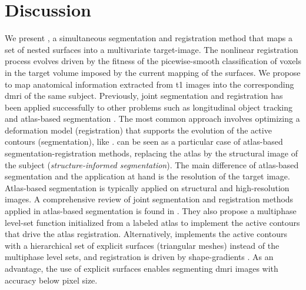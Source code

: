 \section{Discussion}
\label{sec:regseg-discussion}
We present \regseg{}, a simultaneous segmentation and registration method that
  maps a set of nested surfaces into a multivariate target-image.
The nonlinear registration process evolves driven by the fitness of the
  picewise-smooth classification of voxels in the target volume imposed
  by the current mapping of the surfaces.
We propose \regseg{} to map anatomical information extracted from \gls*{t1}
  images into the corresponding \gls*{dmri} of the same subject.
Previously, joint segmentation and registration has been applied successfully to
  other problems such as longitudinal object tracking \citep{paragios_level_2003}
  and atlas-based segmentation \citep{gorthi_active_2011}.
The most common approach involves optimizing a deformation model (registration)
  that supports the evolution of the active contours (segmentation),
  like \cite{paragios_level_2003,yezzi_variational_2003}.
\Regseg{} can be seen as a particular case of atlas-based segmentation-registration methods,
  replacing the atlas by the structural image of the subject (\emph{structure-informed segmentation}).
The main difference of atlas-based segmentation and the application at hand is the resolution of the
  target image.
Atlas-based segmentation is typically applied on structural and high-resolution images.
A comprehensive review of joint segmentation and registration methods applied in atlas-based
  segmentation is found in \citep{gorthi_active_2011}.
They also propose a multiphase level-set function initialized from a labeled atlas to implement
  the active contours that drive the atlas registration.
Alternatively, \regseg{} implements the active contours with a hierarchical set of explicit
  surfaces (triangular meshes) instead of the multiphase level sets, and registration
  is driven by shape-gradients \citep{herbulot_segmentation_2006}.
As an advantage, the use of explicit surfaces enables segmenting \gls*{dmri} images
  with accuracy below pixel size.

